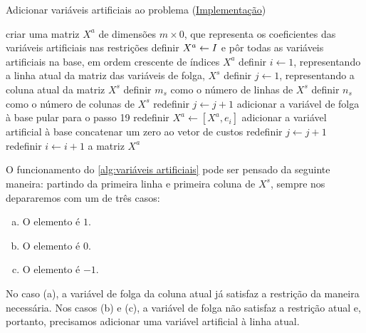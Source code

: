 \begin{algorithm}
\begin{algorithmic}[1]
    \caption{Adicionar variáveis artificiais ao problema (\href{https://github.com/phcentenaro7/Caique.jl/blob/9c78027f1884181846a6321a5640f92c9a718ce4/src/LinearProgram.jl\#L73}{Implementação})}\label{alg:variáveis artificiais}
    \State criar uma matriz $ X^a$ de dimensões $m\times0$, que representa os coeficientes das variáveis artificiais nas restrições
        \State definir $ X^a \gets \vb  \vb I$ e pôr todas as variáveis artificiais na base, em ordem crescente de índices
        \State \Return $ X^a$
    \EndIf
    \State definir $i \gets 1$, representando a linha atual da matriz das variáveis de folga, $ X^s$
    \State definir $j \gets 1$, representando a coluna atual da matriz $ X^s$
    \State definir $m_s$ como o número de linhas de $ X^s$
    \State definir $n_s$ como o número de colunas de $ X^s$
            \State redefinir $j \gets j + 1$
            \State adicionar a variável de folga à base
            \State pular para o passo 19
        \EndIf
        \State redefinir $ X^a \gets [ X^a,  e_i]$
        \State adicionar a variável artificial à base
        \State concatenar um zero ao vetor de custos
            \State redefinir $j \gets j + 1$
        \EndIf
        \State redefinir $i \gets i + 1$
    \EndWhile
    \State \Return a matriz $ X^a$
\end{algorithmic}
\end{algorithm}

O funcionamento do \cref{alg:variáveis artificiais} pode ser pensado da seguinte maneira: partindo da primeira linha e primeira coluna de $ X^s$, sempre nos depararemos com um de três casos:

\begin{enumerate}[(a)]
\item O elemento é $1$.
\item O elemento é $0$.
\item O elemento é $-1$.
\end{enumerate}

No caso (a), a variável de folga da coluna atual já satisfaz a restrição da maneira necessária. Nos casos (b) e (c), a variável de folga não satisfaz a restrição atual e, portanto, precisamos adicionar uma variável artificial à linha atual.

